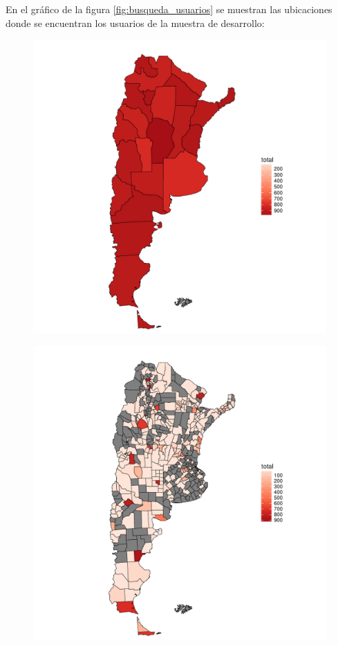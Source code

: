En el gráfico de la figura \ref{fig:busqueda_usuarios} se muestran las ubicaciones donde se encuentran los usuarios de la muestra de desarrollo:


\begin{figure}[!ht]\centering
  \begin{minipage}{0.31\textwidth}
    \includegraphics[width=\linewidth]{./images/mapaprovincias.pdf}
    \label{fig:mapaProvincias} 
   \end{minipage}
   \begin{minipage}{0.31\textwidth}
    \includegraphics[width=\linewidth]{./images/mapadepartamentos.pdf}

\end{minipage}
\end{figure}
